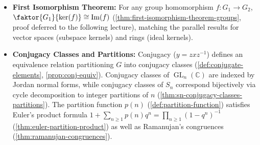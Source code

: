 \begin{overview}
\begin{itemize}
    \item \textbf{First Isomorphism Theorem:} For any group homomorphism $f \colon G_1 \to G_2$, $\faktor{G_1}{\ker(f)} \cong \operatorname{Im}(f)$ (\cref{thm:first-isomorphism-theorem-groups}, proof deferred to the following lecture), matching the parallel results for vector spaces (subspace kernels) and rings (ideal kernels).
    \item \textbf{Conjugacy Classes and Partitions:} Conjugacy ($y = z x z^{-1}$) defines an equivalence relation partitioning $G$ into conjugacy classes (\cref{def:conjugate-elements}, \cref{prop:conj-equiv}). Conjugacy classes of $\operatorname{GL}_n(\mathbb{C})$ are indexed by Jordan normal forms, while conjugacy classes of $S_n$ correspond bijectively via cycle decomposition to integer partitions of $n$ (\cref{thm:sn-conjugacy-classes-partitions}). The partition function $p(n)$ (\cref{def:partition-function}) satisfies Euler's product formula $1 + \sum_{n \ge 1} p(n) q^n = \prod_{n \ge 1} (1 - q^n)^{-1}$ (\cref{thm:euler-partition-product}) as well as Ramanujan's congruences (\cref{thm:ramanujan-congruences}).
\end{itemize}
\end{overview}